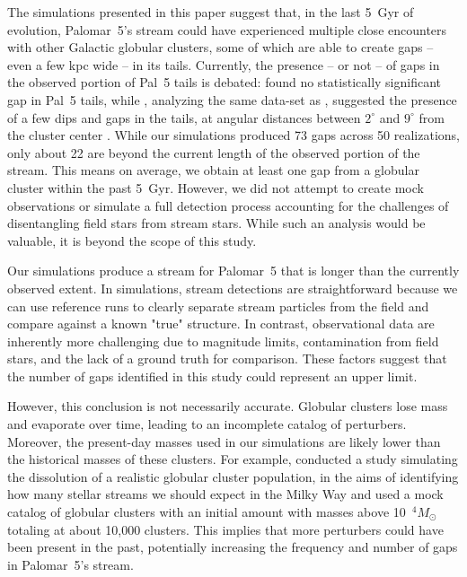 \documentclass{aa}
\begin{document}
  The simulations presented in this paper suggest that, in the last 5~Gyr of evolution, Palomar~5's stream could have experienced multiple close encounters with other Galactic globular clusters, some of which are able to create gaps -- even a few kpc wide -- in its tails. Currently, the presence -- or not -- of gaps in the observed portion of Pal~5 tails is debated: \citet{2016ApJ...819....1I} found no statistically significant gap in Pal~5 tails, while \citet{2017MNRAS.470...60E}, analyzing the same data-set as \citet{2016ApJ...819....1I}, suggested the presence of a few dips and gaps in the tails, at angular distances between $2^\circ$ and $9^\circ$ from the cluster center \citep[see also][]{ 2020ApJ...889...70B}. While our simulations produced 73 gaps across 50 realizations, only about 22 are beyond the current length of the observed portion of the stream. This means on average, we obtain at least one gap from a globular cluster within the past 5~Gyr. However, we did not attempt to create mock observations or simulate a full detection process accounting for the challenges of disentangling field stars from stream stars. While such an analysis would be valuable, it is beyond the scope of this study.

  
  Our simulations produce a stream for Palomar~5 that is longer than the currently observed extent. In simulations, stream detections are straightforward because we can use reference runs to clearly separate stream particles from the field and compare against a known "true" structure. In contrast, observational data are inherently more challenging due to magnitude limits, contamination from field stars, and the lack of a ground truth for comparison. These factors suggest that the number of gaps identified in this study could represent an upper limit.

  However, this conclusion is not necessarily accurate. Globular clusters lose mass and evaporate over time, leading to an incomplete catalog of perturbers. Moreover, the present-day masses used in our simulations are likely lower than the historical masses of these clusters. For example, \citet{2024ApJ...976...54P} conducted a study simulating the dissolution of a realistic globular cluster population, in the aims of identifying how many stellar streams we should expect in the Milky Way and used a mock catalog of globular clusters with an initial amount with masses above 10~$^4 M_\odot$ totaling at about 10,000 clusters. This implies that more perturbers could have been present in the past, potentially increasing the frequency and number of gaps in Palomar~5's stream.
  
\end{document}
